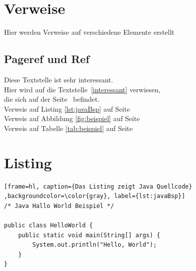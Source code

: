 		


	\section{Verweise}
		Hier werden Verweise auf verschiedene Elemente erstellt \cite{lin1973}
		\subsection{Pageref und Ref} 
			Diese Textstelle ist sehr interessant.\label{interessant} \\				
			Hier wird auf die Textstelle~\ref{interessant} verwiesen, \\
			die sich auf der Seite~\pageref{interessant} befindet.\\[20pt] 
			Verweis auf Listing \ref{lst:javaBsp} auf Seite \pageref{lst:javaBsp} \\
			Verweis auf Abbildung \ref{fig:beispiel} auf Seite \pageref{fig:beispiel} \\
			Verweis auf Tabelle \ref{tab:beispiel} auf Seite \pageref{tab:beispiel}
			
	\section{Listing}
		\lstset{language=java}
		\begin{lstlisting}[frame=hl, caption={Das Listing zeigt Java Quellcode} ,backgroundcolor=\color{gray}, label={lst:javaBsp}]
/* Java Hallo World Beispiel */

public class HelloWorld {
    public static void main(String[] args) {
        System.out.println("Hello, World");
    }
}
		\end{lstlisting} 
		
	
\nocite{wiki:xxx}